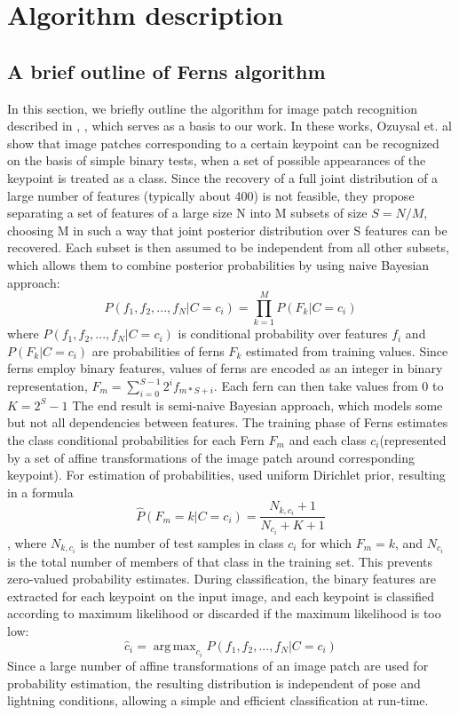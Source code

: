 \documentclass[10pt,twocolumn, a4paper]{article}
\DeclareMathOperator*{\argmax}{arg\,max}
\begin{document}
\section{Algorithm description}
\subsection{A brief outline of Ferns algorithm}
\label{Fern}
In this section, we briefly outline the algorithm for image patch recognition described in \cite{Ferns1}, \cite{Ferns2}, which serves as a basis to our work. In these works, Ozuysal et. al show that image patches corresponding to a certain keypoint can be recognized on the basis of simple binary tests, when a set of possible appearances of the keypoint is treated as a class. Since the recovery of a full joint distribution of a large number of features (typically about 400) is not feasible, they propose separating a set of features of a large size N into M subsets of size $S=N/M$, choosing M in such a way that joint posterior distribution over S features can be recovered. Each subset is then assumed to be independent from all other subsets, which allows them to combine posterior probabilities by using naive Bayesian approach: 
\begin{equation}
\label{naive}
P(f_1,f_2,...,f_N|C=c_i)=\prod_{k=1}^{M}P(F_k|C=c_i)
\end{equation}
where $P(f_1,f_2,...,f_N|C=c_i)$ is conditional probability over features $f_i$ and $P(F_k|C=c_i)$ are probabilities of ferns $F_k$ estimated from training values. Since ferns employ binary features, values of ferns are encoded as an integer in binary representation, $F_m=\sum_{i=0}^{S-1}2^i f_{m*S+i}$. Each fern can then take values from 0 to $K=2^S-1$ The end result is semi-naive Bayesian approach, which models some but not all dependencies between features. 
The training phase of Ferns estimates the class conditional probabilities for each Fern $F_m$ and each class $c_i$(represented by a set of affine transformations of the image patch around corresponding keypoint). For estimation of probabilities, \cite{Ferns1} used uniform Dirichlet prior, resulting in a formula 
\begin{equation}
\label{approx}
\hat{P}(F_m=k|C=c_i)=\frac{N_{k,c_i}+1}{N_{c_i}+K+1}
\end{equation}, where $N_{k,c_i}$ is the number of test samples in class $c_i$ for which $F_m=k$, and $N_{c_i}$ is the total number of members of that class in the training set. This prevents zero-valued probability estimates.
During classification, the binary features are extracted for each keypoint on the input image, and each keypoint is classified according to maximum likelihood or discarded if the maximum likelihood is too low: 
\begin{equation}
\label{estim}
\hat{c}_i=\argmax_{c_i}{P(f_1,f_2,...,f_N|C=c_i)}
\end{equation}
Since a large number of affine transformations of an image patch are used for probability estimation, the resulting distribution is independent of pose and lightning conditions, allowing a simple and efficient classification at run-time.
\end{document}
